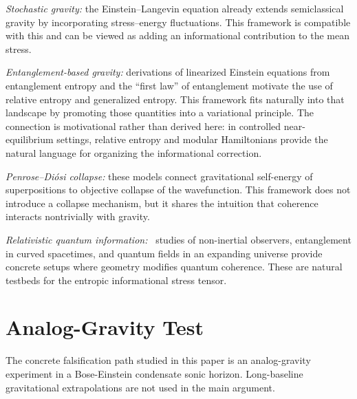 \documentclass[aps,prd,twocolumn,superscriptaddress,nofootinbib,floatfix]{revtex4-2}
\begin{document}
\emph{Stochastic gravity:}
the Einstein--Langevin equation already extends semiclassical gravity by incorporating stress--energy fluctuations.
This framework is compatible with this and can be viewed as adding an informational contribution to the mean stress.

\emph{Entanglement-based gravity:}
derivations of linearized Einstein equations from entanglement entropy and the ``first law'' of entanglement motivate the use of relative entropy and generalized entropy.
This framework fits naturally into that landscape by promoting those quantities into a variational principle.
The connection is motivational rather than derived here: in controlled near-equilibrium settings, relative entropy and modular Hamiltonians provide the natural language for organizing the informational correction.

\emph{Penrose--Diósi collapse:}
these models connect gravitational self-energy of superpositions to objective collapse of the wavefunction.
This framework does not introduce a collapse mechanism, but it shares the intuition that coherence interacts nontrivially with gravity.

\emph{Relativistic quantum information:}~\cite{MannRalph2012}
studies of non-inertial observers, entanglement in curved spacetimes, and quantum fields in an expanding universe provide concrete setups where geometry modifies quantum coherence.
These are natural testbeds for the entropic informational stress tensor.

\section{Analog-Gravity Test}
\label{sec:experiments}

The concrete falsification path studied in this paper is an analog-gravity experiment in a Bose-Einstein condensate sonic horizon. Long-baseline gravitational extrapolations are not used in the main argument.
\end{document}
